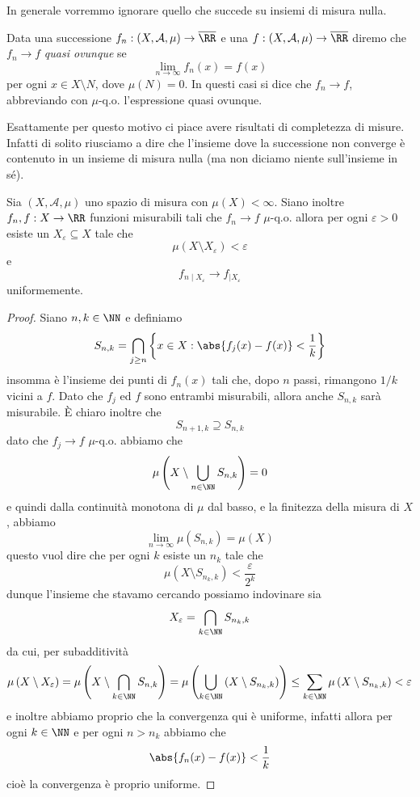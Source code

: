 \documentclass[11pt]{scrartcl}
\begin{document}
	In generale vorremmo ignorare quello che succede su insiemi di misura nulla. 
	\begin{definition}
		Data una successione $f_n:\left(X,\mathcal{A},\mu\right)\to\overline{\RR}$ e una $f:\left(X,\mathcal{A},\mu\right)\to  \overline{\RR}$ diremo che $f_n\to f$ \textit{quasi ovunque} se 
		$$\lim_{n\to\infty}f_n(x)=f(x)$$
		per ogni $x\in X\setminus N$, dove $\mu(N)=0$. In questi casi si dice che $f_n\to f$, abbreviando con $\mu$-q.o. l'espressione quasi ovunque. 
	\end{definition}
	Esattamente per questo motivo ci piace avere risultati di completezza di misure. Infatti di solito riusciamo a dire che l'insieme dove la successione non converge è contenuto in un insieme di misura nulla (ma non diciamo niente sull'insieme in sé).
	\begin{theorem}
		Sia $(X,\mathcal{A},\mu)$ uno spazio di misura con $\mu(X)<\infty$. Siano inoltre $f_n,f:X\to\RR$ funzioni misurabili tali che $f_n\to f$ $\mu$-q.o. allora per ogni $\varepsilon>0$ esiste un $X_\varepsilon\subseteq X$ tale che 
		$$\mu\left(X\setminus X_\varepsilon\right)<\varepsilon$$
		e 
		$$f_{n\mid X_\varepsilon}\to f_{\mid X_\varepsilon}$$
		uniformemente.
	\end{theorem}
	\begin{proof}
		Siano $n,k\in\NN$ e definiamo 
		$$S_{n,k}=\bigcap_{j\ge n}\left\{x\in X:\abs{f_j(x)-f(x)}<\frac{1}{k}\right\}$$
		insomma è l'insieme dei punti di $f_n(x)$ tali che, dopo $n$ passi, rimangono $1/k$ vicini a $f$. Dato che $f_j$ ed $f$ sono entrambi misurabili, allora anche $S_{n,k}$ sarà misurabile. \`E chiaro inoltre che 
		$$S_{n+1,k}\supseteq S_{n,k}$$
		dato che $f_j\to f$ $\mu$-q.o. abbiamo che
		$$\mu\left(X\setminus \bigcup_{n\in\NN}S_{n,k}\right)=0$$
		e quindi dalla continuità monotona di $\mu$ dal basso, e la finitezza della misura di $X$, abbiamo
		$$\lim_{n\to\infty}\mu\left(S_{n,k}\right)=\mu(X)$$ 
		questo vuol dire che per ogni $k$ esiste un $n_k$ tale che 
		$$\mu\left(X\setminus S_{n_k,k}\right)<\frac{\varepsilon}{2^k}$$
		dunque l'insieme che stavamo cercando possiamo indovinare sia
		$$X_\varepsilon=\bigcap_{k\in\NN}S_{n_k,k}$$
		da cui, per subadditività
		$$\mu\left(X\setminus X_\varepsilon\right)=\mu\left(X\setminus \bigcap_{k\in\NN}S_{n,k}\right)=\mu\left(\bigcup_{k\in\NN}\left(X\setminus S_{n_k,k}\right)\right)\le \sum_{k\in\NN}\mu\left(X\setminus S_{n_k,k}\right)<\varepsilon$$
		e inoltre abbiamo proprio che la convergenza qui è uniforme, infatti allora per ogni $k\in \NN$ e per ogni $n>n_k$ abbiamo che 
		$$\abs{f_n(x)-f(x)}<\frac{1}{k}$$
		cioè la convergenza è proprio uniforme.
	\end{proof}
	
\end{document}

